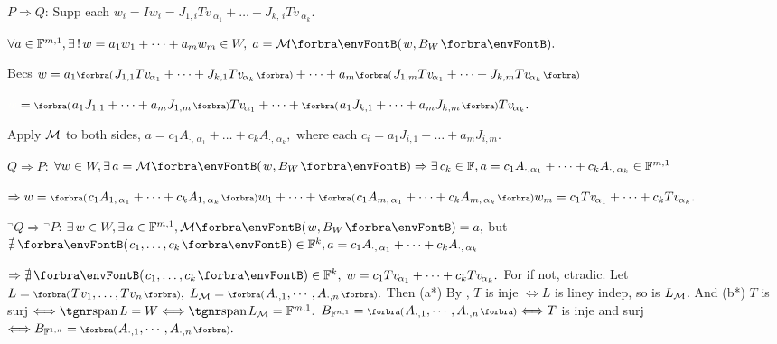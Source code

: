 $P\Rightarrow Q:$\,\;Supp each $w_i=Iw_i=J_{1,i}Tv_{\:\!\!\alpha_1}+\dots+J_{k,\,i}Tv_{\:\!\!\alpha_k}.$\par\quad\Hb
$\forall a\in\Fbb^{m,1},\exists\,!\,w=a_1w_1+\dots+a_mw_m\in W,\;a=\Mt{w,B_W}.$\par\quad\Hb
{}Becs $w=a_1\BigPar{J_{1,1}Tv_{\:\!\!\alpha_1}+\dots+J_{k,1}Tv_{\:\!\!\alpha_k}}+\dots+a_m\BigPar{J_{1,m}Tv_{\:\!\!\alpha_1}+\dots+J_{k,m}Tv_{\:\!\!\alpha_k}}$\par\vspace{2pt}\quad\Hb
{} $\Blind{w}=\BigPar{a_1J_{1,1}+\dots+a_mJ_{1,m}}Tv_{\:\!\!\alpha_1}+\dots+\BigPar{a_1J_{k,1}+\dots+a_mJ_{k,m}}Tv_{\:\!\!\alpha_k}.$\par\vspace{2pt}\quad\Hb
{}Apply $\mathcal{M}$ to both sides, $a=c_1A_{\cdot,\,\alpha_1}+\dots+c_kA_{\cdot,\,\alpha_k},$ where each $c_i=a_1J_{i,1}+\dots+a_mJ_{i,m}.$\par\vspace{6pt}\quad\Hb
$Q\Rightarrow P:$\,\;$\forall w\in W,\exists\,\!\,a=\Mt{w,B_W}\Rightarrow\exists\,c_k\in\Fbb,a=c_1A_{\cdot,{\alpha_1}}+\dots+c_kA_{\cdot,\,\alpha_k}\in\Fbb^{m,1}$\par\quad\Hb
{}$\Rightarrow w=\BigPar{c_1A_{1,\,{\alpha_1}}+\dots+c_kA_{1,\,{\alpha_k}}}w_1+\dots+\BigPar{c_1A_{m,\,{\alpha_1}}+\dots+c_kA_{m,\,{\alpha_k}}}w_m=c_1Tv_{\:\!\!\alpha_1}+\dots+c_kTv_{\:\!\!\alpha_k}.$\vspace{6pt}\par\quad\Hb
${}{^\neg}Q\Rightarrow{}{^\neg}P:$\,\;$\exists\,w\in W,\exists\,a\in\Fbb^{m,1},\Mt{w,B_W}=a,$ but $\nexists\,\Par{c_1,\dots,c_k}\in\Fbb^k,a=c_1A_{\cdot,\,\alpha_1}+\dots+c_kA_{\cdot,\,\alpha_k}$\par\quad\Hb
{}$\Rightarrow\nexists\,\Par{c_1,\dots,c_k}\in\Fbb^k,\;w=c_1Tv_{\:\!\!\alpha_1}+\dots+c_kTv_{\:\!\!\alpha_k}.$ For if not, ctradic.\PfEnd\vspace{6pt}
\ANote Let $L=\BigPar{Tv_1,\dots,Tv_n},\;L_{\mM}=\BigPar{A_{\cdot,1},\cdots,A_{\cdot,n}}.$\parNot
Then (a*) By , $T$ is inje $\Longleftrightarrow L$ is liney indep, so is $L_{\mathcal{M}}$.\parNot
And (b*) $T$ is surj $\Longleftrightarrow\spn L=W\Longleftrightarrow\spn L_{\mM}=\Fbb^{m,1}.$\parNot
\ACoro $B_{\Fbb^{n,1}}=\BigPar{A_{\cdot,1},\cdots,A_{\cdot,n}}\Longleftrightarrow T$ is inje and surj $\Longleftrightarrow B_{\Fbb^{1,n}}=\BigPar{A_{\cdot,1},\cdots,A_{\cdot,n}}.$\parNot
